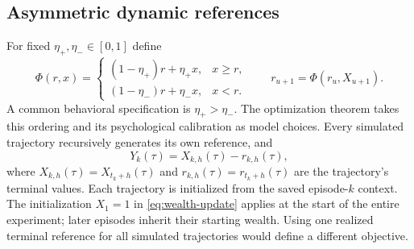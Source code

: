 \documentclass[11pt]{article}
\newcommand{\1}{\mathbf 1}
\begin{document}
\subsection{Asymmetric dynamic references}
For fixed $\eta_+,\eta_-\in[0,1]$ define
\begin{equation}\label{eq:reference-update}
 \Phi(r,x)=
 \begin{cases}(1-\eta_+)r+\eta_+x,&x\ge r,\\
 (1-\eta_-)r+\eta_-x,&x<r.
 \end{cases}
 \qquad r_{u+1}=\Phi(r_u,X_{u+1}).
\end{equation}
A common behavioral specification is $\eta_+>\eta_-$. The optimization theorem takes this ordering and its psychological calibration as model choices. Every simulated trajectory recursively generates its own reference, and
\begin{equation}\label{eq:relative-outcome}
 Y_k(\tau)=X_{k,h}(\tau)-r_{k,h}(\tau),
\end{equation}
where $X_{k,h}(\tau)=X_{t_k+h}(\tau)$ and $r_{k,h}(\tau)=r_{t_k+h}(\tau)$ are the trajectory's terminal values. Each trajectory is initialized from the saved episode-$k$ context. The initialization $X_1=1$ in \eqref{eq:wealth-update} applies at the start of the entire experiment; later episodes inherit their starting wealth. Using one realized terminal reference for all simulated trajectories would define a different objective.
\end{document}
